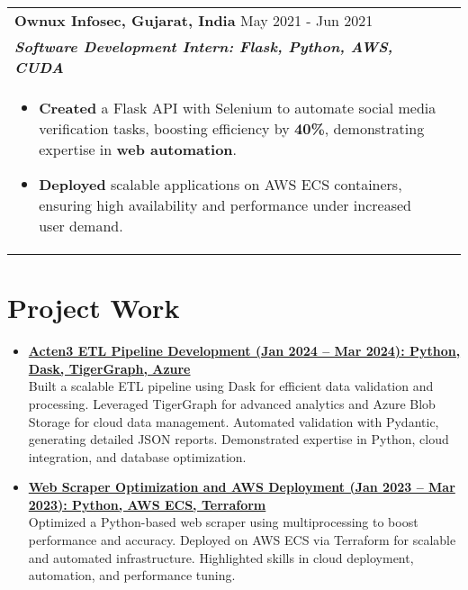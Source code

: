 \documentclass[a4paper,10pt]{article}
\begin{document}
\begin{tabularx}{\linewidth}{ @{}l r@{} }
\textbf{Ownux Infosec, Gujarat, India} \hfill \color[HTML]{371e77} May 2021 - Jun 2021 \\[1pt]
\color[HTML]{371e77}\textbf{\textit{Software Development Intern: Flask, Python, AWS, CUDA}} \\[1pt]
\begin{minipage}[t]{\linewidth}
\begin{itemize}[nosep, after=\strut, leftmargin=2em, itemsep=2pt]
\item \textbf{Created} a Flask API with Selenium to automate social media verification tasks, boosting efficiency by \textbf{40\%}, demonstrating expertise in \textbf{web automation}.
\item \textbf{Deployed} scalable applications on AWS ECS containers, ensuring high availability and performance under increased user demand.
\end{itemize}
\end{minipage}
\end{tabularx}





\section{Project Work}
\begin{itemize}[nosep,after=\strut, leftmargin=2em, itemsep=2pt]
\item \textbf{\href{https://github.com/yash161/Acten3_Etl}{Acten3 ETL Pipeline Development (Jan 2024 – Mar 2024): Python, Dask, TigerGraph, Azure}} \\ Built a scalable ETL pipeline using Dask for efficient data validation and processing. Leveraged TigerGraph for advanced analytics and Azure Blob Storage for cloud data management. Automated validation with Pydantic, generating detailed JSON reports. Demonstrated expertise in Python, cloud integration, and database optimization.
\item \textbf{\href{https://github.com/yash161/Scrapper.git}{Web Scraper Optimization and AWS Deployment (Jan 2023 – Mar 2023): Python, AWS ECS, Terraform}} \\ Optimized a Python-based web scraper using multiprocessing to boost performance and accuracy. Deployed on AWS ECS via Terraform for scalable and automated infrastructure. Highlighted skills in cloud deployment, automation, and performance tuning.
\end{itemize}
\end{document}
